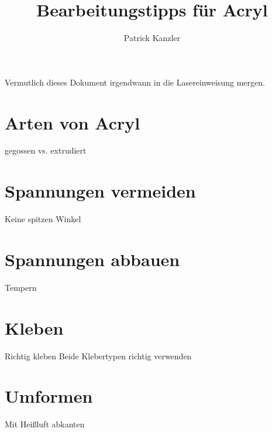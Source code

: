 \documentclass{../../vorlagen/fablab-aushang}
\title{Bearbeitungstipps für Acryl}
\author{Patrick Kanzler}
\begin{document}
\maketitle
 Vermutlich dieses Dokument irgendwann in die Lasereinweisung mergen. 
 \section{Arten von Acryl}
gegossen vs. extrudiert

\section{Spannungen vermeiden}
Keine spitzen Winkel

\section{Spannungen abbauen}
Tempern

\section{Kleben}
Richtig kleben
Beide Klebertypen richtig verwenden

\section{Umformen}
Mit Heißluft abkanten
\end{document}
